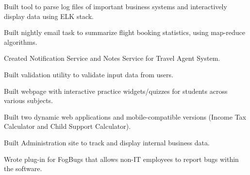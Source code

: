 \documentclass[letterpaper]{deedy-resume} %
\begin{document}
\begin{minipage}[t]{0.66\textwidth}
\sectionspace %



\begin{tightitemize}
\item Built tool to parse log files of important business systems and interactively display data using ELK stack.
\item Built nightly email task to summarize flight booking statistics, using map-reduce algorithms.
\item Created Notification Service and Notes Service for Travel Agent System.
\item Built validation utility to validate input data from users.
\end{tightitemize}

\sectionspace %



\begin{tightitemize}
\item Built webpage with interactive practice widgets/quizzes for students across various subjects.
\end{tightitemize}

\sectionspace %



\begin{tightitemize}
\item Built two dynamic web applications and mobile-compatible versions (Income Tax Calculator and Child Support Calculator).
\item Built Administration site to track and display internal business data.
\item Wrote plug-in for FogBugs that allows non-IT employees to report bugs within the software. 
\end{tightitemize}

\sectionspace %


\end{minipage} %
\end{document}
